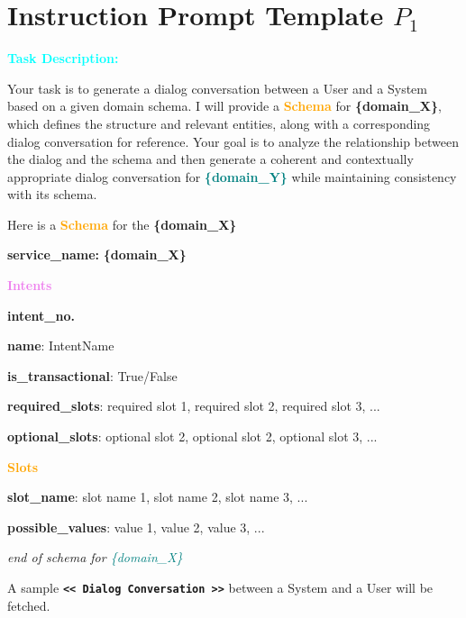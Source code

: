 \section*{Instruction Prompt Template \(P_1\)} \label{sec:prompt1}

\begin{tcolorbox}[colframe=black, colback=white, boxrule=1pt]
\textbf{\textcolor{cyan}{Task Description:}}


Your task is to generate a dialog conversation between a User and a System based on a given domain schema. I will provide a \textbf{{\textcolor{orange}{Schema}}} for \textbf{\textcolor{red!70}{\{domain\_X\}}}, which defines the structure and relevant entities, along with a corresponding dialog conversation for reference. Your goal is to analyze the relationship between the dialog and the schema and then generate a coherent and contextually appropriate dialog conversation for \textbf{\textcolor{teal}{\{domain\_Y\}}} while maintaining consistency with its schema.

\end{tcolorbox}



\begin{tcolorbox}[colframe=black, colback=white, boxrule=1pt]

Here is a \textbf{{\textcolor{orange}{Schema}}} for the \textbf{\textcolor{red!70}{\{domain\_X\}}}

\textbf{service\_name:} \textbf{\textcolor{red!70}{\{domain\_X\}}}

\textbf{\textcolor{violet}{Intents}}

\quad \textbf{{intent\_no.}} 

\quad \textbf{name}: IntentName

\quad \textbf{is\_transactional}: True/False

\quad \textbf{\textcolor{blue!70}{required\_slots}}: required slot 1, required slot 2, required slot 3, ...

\quad \textbf{\textcolor{blue!70}{optional\_slots}}: optional slot 2, optional slot 2, optional slot 3, ...

\textbf{\textcolor{orange}{Slots}}

\quad \quad \textbf{slot\_name}: slot name 1, slot name 2, slot name 3, ...

\quad \quad \textbf{possible\_values}: value 1, value 2, value 3, ...

\textit{end of schema for \textcolor{teal}{\{domain\_X\}}}

A sample \texttt{\textbf{<< Dialog Conversation >>}} between a System and a User will be fetched.
\end{tcolorbox}


